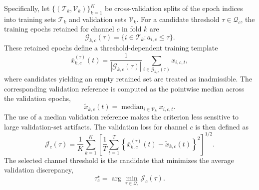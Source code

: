 

Specifically, let \(\{(\mathcal{T}_k,\mathcal{V}_k)\}_{k=1}^{K}\) be
cross-validation splits of the epoch indices into training sets
\(\mathcal{T}_k\) and validation sets \(\mathcal{V}_k\). For a candidate
threshold \(\tau \in \mathcal{Q}_c\), the training epochs retained for channel
\(c\) in fold \(k\) are
\begin{equation}
    \mathcal{G}_{k,c}(\tau)
    = \{ i \in \mathcal{T}_k : a_{i,c} \leq \tau \}.
\end{equation}
These retained epochs define a threshold-dependent training template
\begin{equation}
    \bar{x}^{(\tau)}_{k,c}(t)
    = \frac{1}{|\mathcal{G}_{k,c}(\tau)|}
    \sum_{i \in \mathcal{G}_{k,c}(\tau)} x_{i,c,t},
\end{equation}
where candidates yielding an empty retained set are treated as inadmissible. The
corresponding validation reference is computed as the pointwise median across
the validation epochs,
\begin{equation}
    \tilde{x}_{k,c}(t)
    = \operatorname{median}_{i \in \mathcal{V}_k} x_{i,c,t}.
\end{equation}
The use of a median validation reference makes the criterion less sensitive to
large validation-set artifacts. The validation loss for channel \(c\) is then
defined as
\begin{equation}
    \mathcal{J}_{c}(\tau)
    = \frac{1}{K}\sum_{k=1}^{K}
    \left[
        \frac{1}{T}\sum_{t=1}^{T}
        \left\{\bar{x}^{(\tau)}_{k,c}(t)-\tilde{x}_{k,c}(t)\right\}^{2}
    \right]^{1/2}.
\end{equation}
The selected channel threshold is the candidate that minimizes the average  validation discrepancy,
\begin{equation}
    \tau_c^\star
    = \arg\min_{\tau \in \mathcal{Q}_c} \mathcal{J}_{c}(\tau).
\end{equation}